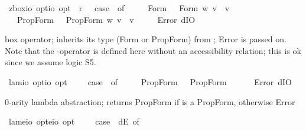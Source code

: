 \begin{isabellebody}
\begin{isamarkuptext}
\end{isamarkuptext}%
\isamarkuptrue%
\isamarkupfalse%
\ z{\isacharunderscore}box{\isacharcolon}{\isacharcolon}{\isachardoublequoteopen}io\ opt{\isasymRightarrow}io\ opt{\isachardoublequoteclose}\ \ {\isachardoublequoteopen}{\isasymbox}\isactrlsup r\ {\isasymphi}\ {\isasymequiv}\ case\ {\isasymphi}\ of\ \isanewline
\ \ \ \ Form\ {\isasympsi}\ {\isasymRightarrow}\ Form\ {\isacharparenleft}{\isasymlambda}w{\isachardot}\ {\isasymforall}v{\isachardot}\ {\isasympsi}\ v{\isacharparenright}\isanewline
\ \ {\isacharbar}\ PropForm\ {\isasympsi}\ {\isasymRightarrow}\ PropForm\ {\isacharparenleft}{\isasymlambda}w{\isachardot}\ {\isasymforall}v{\isachardot}\ {\isasympsi}\ v{\isacharparenright}\isanewline
\ \ {\isacharbar}\ {\isacharunderscore}\ {\isasymRightarrow}\ Error\ dIO{\isachardoublequoteclose}%
\begin{isamarkuptext}%
box operator; \isa{{\isasymbox}\ {\isasymphi}} inherits its type (Form or PropForm) from \isa{{\isasymphi}}; Error is passed on.
Note that the \isa{{\isasymbox}}-operator is defined here without an accessibility relation; this is ok since we assume logic S5.%
\end{isamarkuptext}%
\isamarkuptrue%
\isamarkupfalse%
\ lam{}{\isacharcolon}{\isacharcolon}{\isachardoublequoteopen}io\ opt{\isasymRightarrow}io\ opt{\isachardoublequoteclose}\ \ {\isachardoublequoteopen}{\isasymlambda}\ {\isasymphi}\ {\isasymequiv}\ case\ {\isasymphi}\ of\ \isanewline
\ \ \ \ PropForm\ {\isasympsi}\ {\isasymRightarrow}\ PropForm\ {\isasympsi}\isanewline
\ \ {\isacharbar}\ {\isacharunderscore}\ {\isasymRightarrow}\ Error\ dIO{\isachardoublequoteclose}%
\begin{isamarkuptext}%
0-arity lambda abstraction;  returns PropForm \isa{{\isasymphi}} if \isa{{\isasymphi}} is a PropForm, otherwise Error%
\end{isamarkuptext}%
\isamarkuptrue%
\isamarkupfalse%
\ lam{}{\isacharcolon}{\isacharcolon}{\isachardoublequoteopen}{\isacharparenleft}e{\isasymRightarrow}io\ opt{\isacharparenright}{\isasymRightarrow}{\isacharparenleft}e{\isasymRightarrow}io{\isacharparenright}\ opt{\isachardoublequoteclose}\ \ {\isachardoublequoteopen}{\isasymlambda}\ {\isasymPhi}\ {\isasymequiv}\ case\ {\isacharparenleft}{\isasymPhi}\ dE{\isacharparenright}\ of\isanewline

\end{isabellebody}
